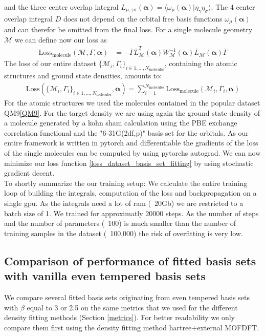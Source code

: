  and the three center overlap integral $L_{\mu,\gamma\sigma}(\mathbf{\alpha}) = \langle \omega_\mu(\mathbf{\alpha})|\eta_\gamma\eta_\sigma\rangle$. The 4 center overlap integral $D$ does not depend on the orbital free basis functions $\omega_\mu(\mathbf{\alpha})$ and can therefor be omitted from the final loss. For a single molecule geometry $\mathcal{M}$ we can define now our loss as
 \begin{align}\label{loss_basis_set_fitting}
    \text{Loss}_\text{molecule}(\mathcal{M}, \Gamma,\mathbf{\alpha}) & = - \bar \Gamma \bar L_{\mathcal{M}}^T(\mathbf{\alpha}) W_{\mathcal{M}}^{-1}(\mathbf{\alpha}) \bar L_{\mathcal{M}}(\mathbf{\alpha}) \bar \Gamma
 \end{align}
The loss of our entire dataset $\{\mathcal{M}_i,\Gamma_i\}_{i\in 1,...,N_{\text{molecules}}}$, containing the atomic structures and ground state densities, amounts to:
\begin{align} \label{loss_dataset_basis_set_fitting}
    \text{Loss}(\{\mathcal{M}_i,\Gamma_i\}_{i\in 1,...,N_{\text{molecules}}},\mathbf{\alpha}) = \sum\limits_{i=1}^{N_{\text{molecules}}} \text{Loss}_\text{molecule}(\mathcal{M}_i, \Gamma_i,\mathbf{\alpha})
\end{align}
For the atomic structures we used the molecules contained in the popular dataset QM9\ref{QM9}. For the target density we are using again the ground state density of a molecule generated by a kohn sham calculation using the PBE exchange correlation functional and the "6-31G(2df,p)" basis set for the orbitals.
As our entire framework is written in pytorch and differentiable the gradients of the loss of the single molecules can be computed by using pytorchs autograd. We can now minimize our loss function \eqref{loss_dataset_basis_set_fitting} by using stochastic gradient decent.\\
To shortly summarize the our training setup:
We calculate the entire training loop of building the integrals, computation of the loss and backpropagation on a single gpu. As the integrals need a lot of ram (~20Gb) we are restricted to a batch size of 1. We trained for approximatly 20000 steps. As the number of steps and the number of parameters (~100) is much smaller than the number of training samples in the dataset (~100,000) the risk of overfitting is very low.
 \subsection{Comparison of performance of fitted basis sets with vanilla even tempered basis sets}
 We compare several fitted basis sets originating from even tempered basis sets with $\beta$ equal to 3 or 2.5 on the same metrics that we used for the different density fitting methods (Section \ref{metrics}). For better readability we only compare them first using the density fitting method hartree+external MOFDFT.
